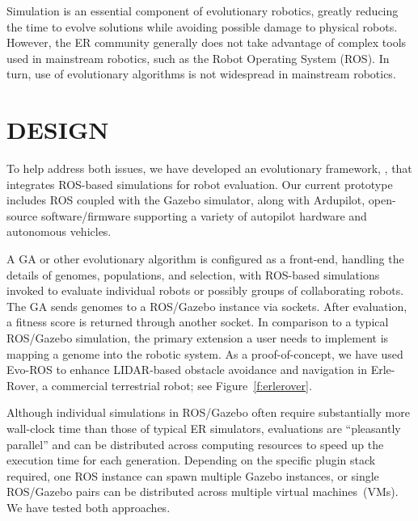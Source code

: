 \documentclass[letterpaper, 10 pt, journal]{ieeeconf}  %
\begin{document}
Simulation is an essential component of 
evolutionary robotics, greatly reducing the 
time to evolve solutions while avoiding possible damage to physical robots.
%
However, the ER community generally does not take advantage of complex tools
used in mainstream robotics, such as the Robot Operating System (ROS).
In turn, use of evolutionary algorithms is not widespread in mainstream robotics.


\section{DESIGN}
To help address both issues, we have developed an evolutionary framework, {\project}, that integrates ROS-based simulations for robot evaluation.  
%
Our current prototype includes ROS coupled with the Gazebo simulator, along
with Ardupilot, open-source software/firmware supporting a
variety of autopilot hardware and autonomous vehicles.

A GA or other evolutionary algorithm is configured as a
front-end, handling the details of genomes, populations, and
selection, with ROS-based simulations invoked to evaluate
individual robots or possibly groups of collaborating robots.
The GA sends genomes to a ROS/Gazebo instance via sockets.
After evaluation, a 
fitness score is returned through another socket.
%
In comparison to a typical ROS/Gazebo simulation, the primary extension a user needs to implement is mapping a genome into the robotic system.  
%
As a proof-of-concept, we have 
used Evo-ROS to enhance LIDAR-based obstacle avoidance and navigation in 
Erle-Rover, a commercial terrestrial robot; see Figure~\ref{f:erlerover}.


%
Although individual simulations in ROS/Gazebo often require substantially more wall-clock time than those of typical ER  simulators, 
%
evaluations are ``pleasantly parallel'' and can be 
distributed across computing resources to speed up the execution time for each generation.  
%
Depending on the specific plugin stack required, one ROS instance can spawn 
multiple Gazebo instances, or single ROS/Gazebo pairs can be distributed across multiple virtual machines~(VMs).  
%
We have tested both approaches.
\end{document}
